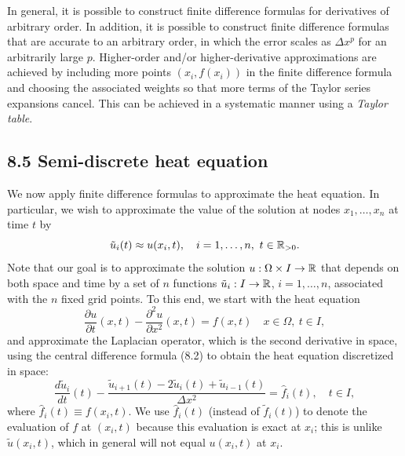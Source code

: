 In general, it is possible to construct finite difference formulas for derivatives of arbitrary order. In addition, it is possible to construct finite difference formulas that are accurate to an arbitrary order, in which the error scales as $\Delta x^p$ for an arbitrarily large $p$. Higher-order and/or higher-derivative approximations are achieved by including more points $(x_i, f(x_i))$ in the finite difference formula and choosing the associated weights so that more terms of the Taylor series expansions cancel. This can be achieved in a systematic manner using a \textit{Taylor table}.

\subsection{8.5 Semi-discrete heat equation}
We now apply finite difference formulas to approximate the heat equation. In particular, we wish to approximate the value of the solution at nodes $x_1, \dots, x_n$ at time $t$ by
\[\tilde{u}_i(t) \approx u(x_i, t), \quad i = 1, \dots, n, \ t \in \mathbb{R}_{>0}.\]
Note that our goal is to approximate the solution $u : \Omega \times I \to \mathbb{R}$ that depends on both space and time by a set of $n$ functions $\tilde{u}_i : I \to \mathbb{R}$, $i = 1, \dots, n$, associated with the $n$ fixed grid points. To this end, we start with the heat equation
\[\frac{\partial u}{\partial t}(x, t) - \frac{\partial^2 u}{\partial x^2}(x, t) = f(x, t) \quad x \in \Omega, \ t \in I,\]
and approximate the Laplacian operator, which is the second derivative in space, using the central difference formula (8.2) to obtain the heat equation discretized in space:
\begin{equation*}
    \frac{d\tilde{u}_i}{dt}(t) - \frac{\tilde{u}_{i+1}(t) - 2\tilde{u}_i(t) + \tilde{u}_{i-1}(t)}{\Delta x^2} = \hat{f}_i(t), \quad t \in I, \tag{8.3}
\end{equation*}
where $\hat{f}_i(t) \equiv f(x_i, t)$. We use $\hat{f}_i(t)$ (instead of $\tilde{f}_i(t)$) to denote the evaluation of $f$ at $(x_i, t)$ because this evaluation is exact at $x_i$; this is unlike $\tilde{u}(x_i, t)$, which in general will not equal $u(x_i, t)$ at $x_i$.


